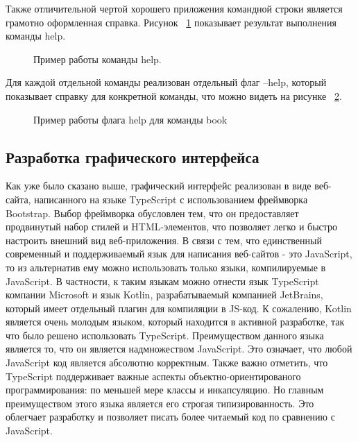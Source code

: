 Также отличительной чертой хорошего приложения командной строки является грамотно оформленная справка.
Рисунок ~\ref{ris:help_example} показывает результат выполнения команды help. 

\begin{figure}[h!]
    \caption{Пример работы команды help.}
    \label{ris:help_example}
\end{figure}

Для каждой отдельной команды реализован
отдельный флаг --help, который показывает справку для конкретной команды, что можно видеть на рисунке 
~\ref{ris:help_book_example}. 

\begin{figure}[h!]
\caption{Пример работы флага help для команды book}
\label{ris:help_book_example}
\end{figure}

\subsection*{Разработка графического интерфейса}

Как уже было сказано выше, графический интерфейс реализован в виде веб-сайта, написанного на языке TypeScript с 
использованием фреймворка Bootstrap.
Выбор фреймворка обусловлен тем, что он предоставляет продвинутый набор стилей и HTML-элементов, что позволяет 
легко и быстро настроить внешний вид веб-приложения.
В связи с тем, что единственный современный и поддерживаемый язык для написания веб-сайтов - это JavaScript, то 
из альтернатив ему можно использовать только языки, компилируемые в JavaScript. В частности, к таким языкам можно 
отнести язык TypeScript компании Microsoft и язык Kotlin, разрабатываемый компанией JetBrains, который имеет 
отдельный плагин для компиляции в JS-код. К сожалению, Kotlin является очень молодым языком, который находится в 
активной разработке, так что было решено использовать TypeScript. Преимуществом данного языка является то, что 
он является надмножеством JavaScript. Это означает, что любой JavaScript код является абсолютно корректным. Также 
важно отметить, что TypeScript поддерживает важные аспекты объектно-ориентированого программирования: по меньшей мере классы 
и инкапсуляцию. Но главным преимуществом этого языка является его строгая типизированность. 
Это облегчает разработку и позволяет писать более читаемый код по сравнению с JavaScript.


